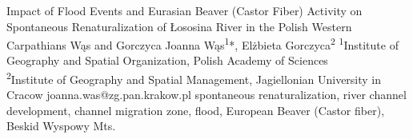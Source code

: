\abstract
{Impact of Flood Events and Eurasian Beaver (Castor Fiber) Activity on Spontaneous Renaturalization of Łososina River in the Polish Western Carpathians} %
{Wąs and Gorczyca} %
{Joanna Wąs\textsuperscript{1}*, Elżbieta Gorczyca\textsuperscript{2}} %
{\KLtag} %
{\textsuperscript{1}Institute of Geography and Spatial Organization, Polish Academy of Sciences\\
	\textsuperscript{2}Institute of Geography and Spatial Management, Jagiellonian University in Cracow} %
{joanna.was@zg.pan.krakow.pl}  %
{spontaneous renaturalization, river channel development, channel migration zone, flood, European Beaver (Castor fiber), Beskid Wyspowy Mts.}%

